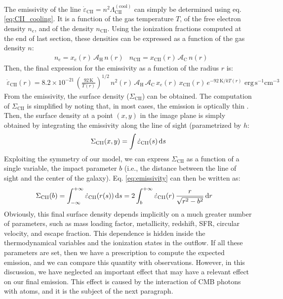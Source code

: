 The emissivity of the \CII line $\dot{\varepsilon}_\mathrm{CII} = n^2 \Lambda^\mathrm{(cool)}_\mathrm{CII}$ can simply be determined using eq. \ref{eq:CII_cooling}. It is a function of the gas temperature $T$, of the free electron density $n_e$, and of the \CIIion density $n_\mathrm{CII}$. Using the ionization fractions computed at the end of last section, these densities can be expressed as a function of the gas density $n$:
\begin{subequations}
\begin{align}
&n_e = x_e(r)\,\mathcal{A}_\mathrm{H}\,n(r)
&n_\mathrm{CII} = x_\mathrm{CII}(r)\,\mathcal{A}_\mathrm{C}\,n(r)
\end{align}
\end{subequations}
Then, the final expression for the emissivity as a function of the radius $r$ is:
\begin{align}
 \dot{\varepsilon}_\mathrm{CII} (r) = 8.2\times10^{-21} \,\left(\frac{92\,\mathrm{K}}{T(r)}\right)^{1/2}\,n^2(r)\,\mathcal{A}_\mathrm{H}\,\mathcal{A}_\mathrm{C}\,x_e(r) \,x_\mathrm{CII}(r) \,e^{-92\ \mathrm{K}/kT(r)}\,\,\mathrm{erg}\,\mathrm{s}^{-1}\mathrm{cm}^{-3} \label{eq:emissivity_CII}
\end{align}
From the emissivity, the \CII surface density ($\Sigma_\mathrm{CII}$) can be obtained. The computation of $\Sigma_\mathrm{CII}$ is simplified by noting that, in most cases, the \CII emission is optically thin \citep[e.g.,][]{osterbrock1992}. Then, the \CII surface density at a point $(x,y)$ in the image plane is simply obtained by integrating the emissivity along the line of sight (parametrized by $h$:
\begin{align}
\Sigma_\mathrm{CII}(x,y)=\int\dot{\varepsilon}_\mathrm{CII}(s)\,\mathrm{d} s
\label{eq:emissivity}
\end{align}
Exploiting the symmetry of our model, we can express $\Sigma_\mathrm{CII}$ as a function of a single variable, the impact parameter $b$ (i.e., the distance between the line of sight and the center of the galaxy). Eq. \ref{eq:emissivity} can then be written as:
\begin{align}
\Sigma_\mathrm{CII}(b)&=\int_{-\infty}^{+\infty} \dot{\varepsilon}_\mathrm{CII}(r(s))\, \mathrm{d} s = 2 \int_{b}^{+\infty} \dot{\varepsilon}_\mathrm{CII}(r)\, \frac{r}{\sqrt{r^2 - b^2}}\,\mathrm{d} r \,
\label{eq:final_intensity}
\end{align}
Obviously, this final \CII surface density depends implicitly on a much greater number of parameters, such as mass loading factor, metallicity, redshift, SFR, circular velocity, and escape fraction. This dependence is hidden inside the thermodynamical variables and the ionization states in the outflow.  If all these parameters are set, then we have a prescription to compute the expected \CII emission, and we can compare this quantity with observations. However, in this discussion, we have neglected an important effect that may have a relevant effect on our final \CII emission. This effect is caused by the interaction of CMB photons with \CIIion atoms, and it is the subject of the next paragraph. 


